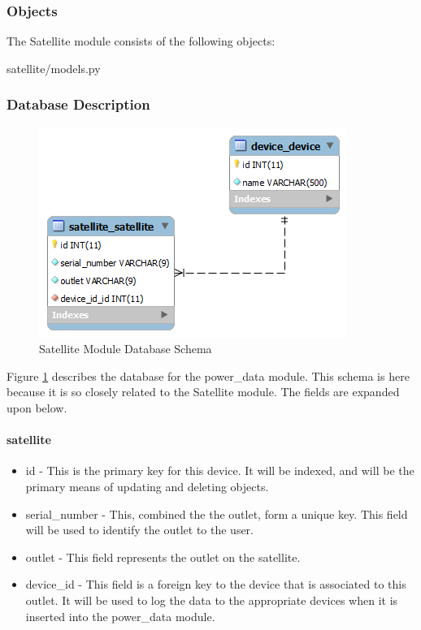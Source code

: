 \subsubsection{Objects}

The Satellite module consists of the following objects:

\begin{table}[H]
  \centering
  \caption{satellite/models.py}
  \label{code:satellite/models}
  
\end{table}

\subsubsection{Database Description}

\begin{figure}[H]
\centering
\includegraphics[scale=0.75]{Software/images/Database/Satellite.png}
\caption{Satellite Module Database Schema}
\label{img:S_Satellite_Device}
\end{figure}

Figure \ref{img:S_Satellite_Device} describes the database for the power\_data module. 
This schema is here because it is so closely related to the Satellite module. 
The fields are expanded upon below.

\paragraph{satellite}

\begin{itemize}
 \item id - This is the primary key for this device. It will be indexed, and will be the primary means of updating and deleting objects.
 \item serial\_number - This, combined the the outlet, form a unique key. This field will be used to identify the outlet to the user.
 \item outlet - This field represents the outlet on the satellite. 
 \item device\_id - This field is a foreign key to the device that is associated to this outlet. It will be used to log the data to the appropriate devices when it is inserted into the power\_data module.
\end{itemize}

